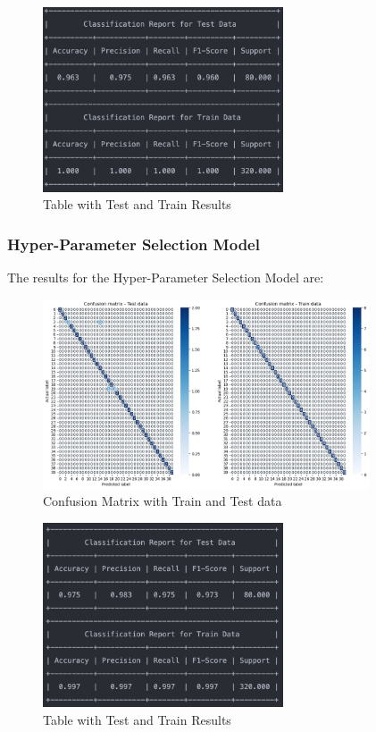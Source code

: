 \documentclass[conference]{IEEEtran}
\begin{document}
\begin{figure}[!h!]
    \includegraphics[width=2.8in]{GNB/r_1.png}%
    \caption{Table with Test and Train Results}%
    \label{fig:conf_gnb_r_1}%
\end{figure}

\subsubsection{Hyper-Parameter Selection Model}

The results for the Hyper-Parameter Selection Model are:

\begin{figure}[!h!]
    \includegraphics[width=3.8in]{GNB/2.png}%
    \caption{Confusion Matrix with Train and Test data}%
    \label{fig:conf_gnb_2}%
\end{figure}

\begin{figure}[!h!]
    \includegraphics[width=2.8in]{GNB/r_2.png}%
    \caption{Table with Test and Train Results}%
    \label{fig:conf_gnb_r_2}%
\end{figure}
\end{document}
